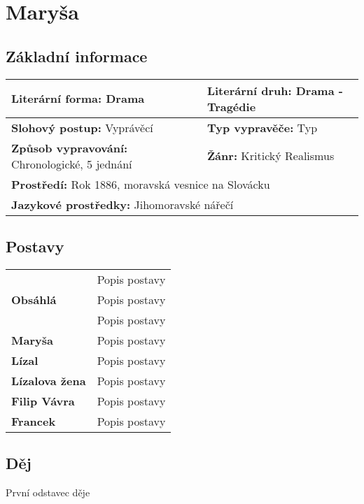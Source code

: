 \section{Maryša}
\subsection*{Základní informace}
\begin{tabularx}{\linewidth}{l|l}
    \textbf{Literární forma:} Drama                       & \textbf{Literární druh:} Drama - Tragédie \\
    \hline
    \textbf{Slohový postup:} Vyprávěcí                    & \textbf{Typ vypravěče:} Typ               \\
    \hline
    \textbf{Způsob vypravování:} Chronologické, 5 jednání & \textbf{Žánr:} Kritický Realismus         \\
    \hline
    \multicolumn{2}{l}{\textbf{Prostředí:} Rok 1886, moravská vesnice na Slovácku}                    \\
    \hline
    \multicolumn{2}{l}{\textbf{Jazykové prostředky:} Jihomoravské nářečí}                             \\
\end{tabularx}
\subsection*{Postavy}
\begin{tabularx}{\linewidth}{l|l}
    \multirow{3}{15em}{\textbf{Obsáhlá}} & Popis postavy \\
                                         & Popis postavy \\
                                         & Popis postavy \\
    \hline
    \textbf{Maryša}                      & Popis postavy \\
    \hline
    \textbf{Lízal}                       & Popis postavy \\
    \hline
    \textbf{Lízalova žena}               & Popis postavy \\
    \hline
    \textbf{Filip Vávra}                 & Popis postavy \\
    \hline
    \textbf{Francek}                     & Popis postavy \\
\end{tabularx}
\subsection*{Děj}
První odstavec děje

